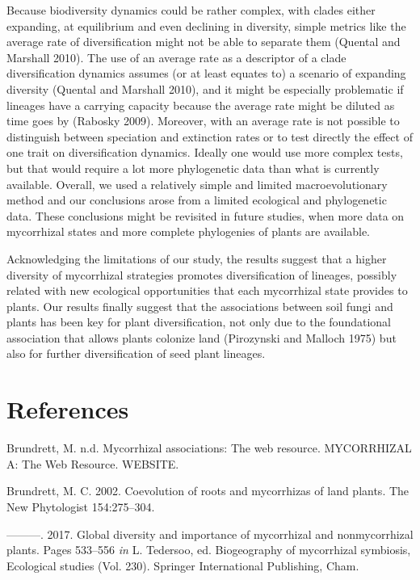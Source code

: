 \documentclass[12pt,]{article}
\begin{document}
Because biodiversity dynamics could be rather complex, with clades
either expanding, at equilibrium and even declining in diversity, simple
metrics like the average rate of diversification might not be able to
separate them (Quental and Marshall 2010). The use of an average rate as
a descriptor of a clade diversification dynamics assumes (or at least
equates to) a scenario of expanding diversity (Quental and Marshall
2010), and it might be especially problematic if lineages have a
carrying capacity because the average rate might be diluted as time goes
by (Rabosky 2009). Moreover, with an average rate is not possible to
distinguish between speciation and extinction rates or to test directly
the effect of one trait on diversification dynamics. Ideally one would
use more complex tests, but that would require a lot more phylogenetic
data than what is currently available. Overall, we used a relatively
simple and limited macroevolutionary method and our conclusions arose
from a limited ecological and phylogenetic data. These conclusions might
be revisited in future studies, when more data on mycorrhizal states and
more complete phylogenies of plants are available.

Acknowledging the limitations of our study, the results suggest that a
higher diversity of mycorrhizal strategies promotes diversification of
lineages, possibly related with new ecological opportunities that each
mycorrhizal state provides to plants. Our results finally suggest that
the associations between soil fungi and plants has been key for plant
diversification, not only due to the foundational association that
allows plants colonize land (Pirozynski and Malloch 1975) but also for
further diversification of seed plant lineages.

\hypertarget{references}{%
\section{References}\label{references}}

\hypertarget{refs}{}
\leavevmode\hypertarget{ref-brundrett_website_2008}{}%
Brundrett, M. n.d. Mycorrhizal associations: The web resource.
MYCORRHIZAL A: The Web Resource. WEBSITE.

\leavevmode\hypertarget{ref-brundrett_2002}{}%
Brundrett, M. C. 2002. Coevolution of roots and mycorrhizas of land
plants. The New Phytologist 154:275--304.

\leavevmode\hypertarget{ref-brundrett_2017}{}%
---------. 2017. Global diversity and importance of mycorrhizal and
nonmycorrhizal plants. Pages 533--556 \emph{in} L. Tedersoo, ed.
Biogeography of mycorrhizal symbiosis, Ecological studies (Vol. 230).
Springer International Publishing, Cham.
\end{document}
